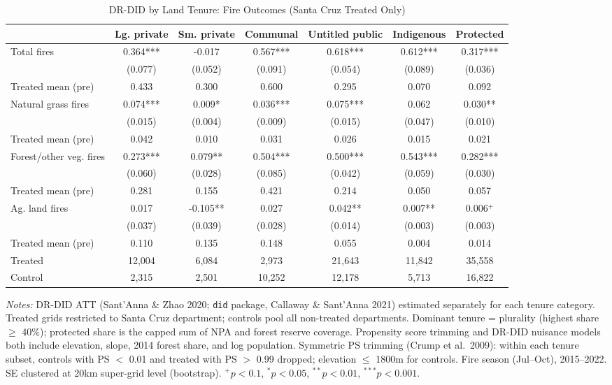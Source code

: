\begin{table}[htbp]
\centering
\small
\caption{DR-DID by Land Tenure: Fire Outcomes (Santa Cruz Treated Only)}
\label{tab:did_drdid_fire_bydept_sc}
\begin{tabular}{lcccccc}
\toprule
 & Lg. private & Sm. private & Communal & Untitled public & Indigenous & Protected \\
\midrule
Total fires & 0.364*** & -0.017 & 0.567*** & 0.618*** & 0.612*** & 0.317*** \\
 & (0.077) & (0.052) & (0.091) & (0.054) & (0.089) & (0.036) \\
Treated mean (pre) & 0.433 & 0.300 & 0.600 & 0.295 & 0.070 & 0.092 \\
[0.5em]
Natural grass fires & 0.074*** & 0.009* & 0.036*** & 0.075*** & 0.062 & 0.030** \\
 & (0.015) & (0.004) & (0.009) & (0.015) & (0.047) & (0.010) \\
Treated mean (pre) & 0.042 & 0.010 & 0.031 & 0.026 & 0.015 & 0.021 \\
[0.5em]
Forest/other veg. fires & 0.273*** & 0.079** & 0.504*** & 0.500*** & 0.543*** & 0.282*** \\
 & (0.060) & (0.028) & (0.085) & (0.042) & (0.059) & (0.030) \\
Treated mean (pre) & 0.281 & 0.155 & 0.421 & 0.214 & 0.050 & 0.057 \\
[0.5em]
Ag. land fires & 0.017 & -0.105** & 0.027 & 0.042** & 0.007** & 0.006$^{+}$ \\
 & (0.037) & (0.039) & (0.028) & (0.014) & (0.003) & (0.003) \\
Treated mean (pre) & 0.110 & 0.135 & 0.148 & 0.055 & 0.004 & 0.014 \\
\midrule
Treated & 12,004 & 6,084 & 2,973 & 21,643 & 11,842 & 35,558 \\
Control & 2,315 & 2,501 & 10,252 & 12,178 & 5,713 & 16,822 \\
\bottomrule
\end{tabular}
\begin{tablenotes}[flushleft]
\small
\item \textit{Notes:} DR-DID ATT (Sant'Anna \& Zhao 2020; \texttt{did} package, Callaway \& Sant'Anna 2021) estimated separately for each tenure category. Treated grids restricted to Santa Cruz department; controls pool all non-treated departments. Dominant tenure = plurality (highest share $\geq$ 40\%); protected share is the capped sum of NPA and forest reserve coverage. Propensity score trimming and DR-DID nuisance models both include elevation, slope, 2014 forest share, and log population. Symmetric PS trimming (Crump et al.\ 2009): within each tenure subset, controls with PS $<$ 0.01 and treated with PS $>$ 0.99 dropped; elevation $\leq$ 1800m for controls. Fire season (Jul--Oct), 2015--2022. SE clustered at 20km super-grid level (bootstrap). $^{+}p<0.1$, $^{*}p<0.05$, $^{**}p<0.01$, $^{***}p<0.001$.
\end{tablenotes}
\end{table}
